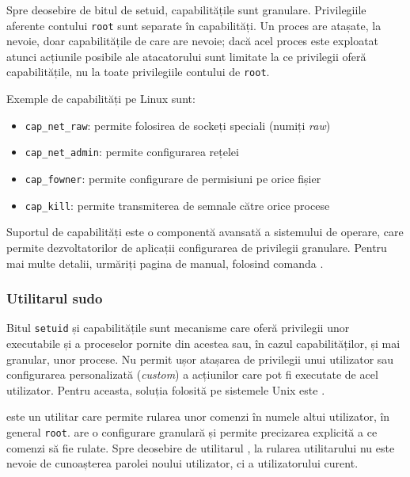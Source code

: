 Spre deosebire de bitul de setuid, capabilitățile sunt granulare. Privilegiile
aferente contului \texttt{root} sunt separate în capabilități. Un proces are atașate, la
nevoie, doar capabilitățile de care are nevoie; dacă acel proces este exploatat
atunci acțiunile posibile ale atacatorului sunt limitate la ce privilegii oferă
capabilitățile, nu la toate privilegiile contului de \texttt{root}.

Exemple de capabilități pe Linux sunt:

\begin{itemize}
  \item \texttt{cap\_net\_raw}: permite folosirea de sockeți speciali (numiți \textit{raw})
  \item \texttt{cap\_net\_admin}: permite configurarea rețelei
  \item \texttt{cap\_fowner}: permite configurare de permisiuni pe orice fișier
  \item \texttt{cap\_kill}: permite transmiterea de semnale către orice procese
\end{itemize}

\begin{note}
Suportul de capabilități este o componentă avansată a sistemului de
operare, care permite dezvoltatorilor de aplicații configurarea de privilegii
granulare. Pentru mai multe detalii, urmăriți pagina de manual, folosind comanda .
\end{note}

\subsubsection{Utilitarul sudo}
\label{sec:user:sudo}

Bitul \texttt{setuid} și capabilitățile sunt mecanisme care oferă privilegii unor
executabile și a proceselor pornite din acestea sau, în cazul capabilităților, și mai granular, unor procese. Nu permit ușor atașarea de privilegii unui utilizator
sau configurarea personalizată (\textit{custom}) a acțiunilor care pot fi
executate de acel utilizator. Pentru aceasta, soluția folosită pe sistemele Unix
este .

 este un utilitar care permite rularea unor comenzi în numele altui
utilizator, în general \texttt{root}.  are o configurare granulară și permite
precizarea explicită a ce comenzi să fie rulate. Spre deosebire de utilitarul
, la rularea utilitarului  nu este nevoie de cunoașterea parolei noului
utilizator, ci a utilizatorului curent.

